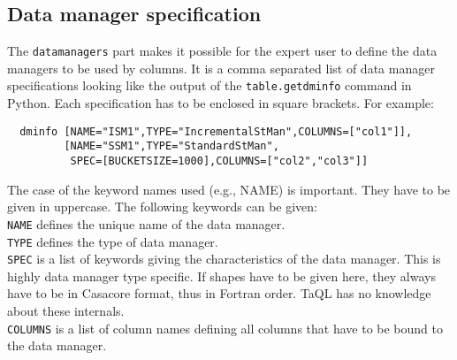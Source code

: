 \subsection{\label{TAQL:DMINFO}Data manager specification}
The \texttt{datamanagers} part makes it possible for the expert user to
define the data managers to be used by columns. It is a comma separated
list of data manager specifications looking like the output of the
\texttt{table.getdminfo} command in Python.
Each specification has to be enclosed in square brackets.
For example:
\begin{verbatim}
  dminfo [NAME="ISM1",TYPE="IncrementalStMan",COLUMNS=["col1"]],
         [NAME="SSM1",TYPE="StandardStMan",
          SPEC=[BUCKETSIZE=1000],COLUMNS=["col2","col3"]]
\end{verbatim}
The case of the keyword names used (e.g., NAME) is important.
They have to be given in uppercase. The following keywords can be
given:
\\\texttt{NAME} defines the unique name of the data manager.
\\\texttt{TYPE} defines the type of data manager.
\\\texttt{SPEC} is a list of keywords giving the characteristics of the
data manager. This is highly data manager type specific. If shapes
have to be given here, they always have to be in Casacore format,
thus in Fortran order. TaQL has no knowledge about these internals.
\\\texttt{COLUMNS} is a list of column names defining all columns that
have to be bound to the data manager.


